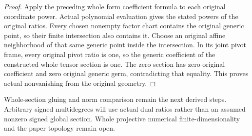 \begin{proof}
Apply the preceding whole form coefficient formula to each original coordinate power. Actual polynomial evaluation gives the stated powers of the original ratios. Every chosen nonempty factor chart contains the original generic point, so their finite intersection also contains it. Choose an original affine neighborhood of that same generic point inside the intersection. In its joint pivot frame, every original pivot ratio is one, so the generic coefficient of the constructed whole tensor section is one. The zero section has zero original coefficient and zero original generic germ, contradicting that equality. This proves actual nonvanishing from the original geometry.
\end{proof}
Whole-section gluing and norm comparison remain the next derived steps. Arbitrary signed multidegrees will use actual dual ratios rather than an assumed nonzero signed global section. Whole projective numerical finite-dimensionality and the paper topology remain open.
